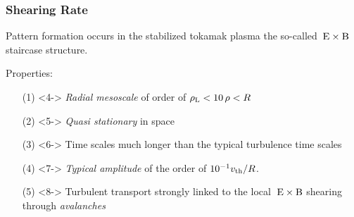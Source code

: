 \documentclass[compress,aspectratio=1610,noflama]{beamer}
\newcommand{\vect}[1]{\boldsymbol{\mathbf{#1}}}
\begin{document}
	\begin{frame}
		\frametitle{Shearing Rate}

		 Pattern formation occurs in the stabilized tokamak plasma the so-called $\mathrm{\:E}\times\mathrm{B}$ staircase structure. \\\bigskip
		
		 Properties:
		\begin{enumerate}
			\item[(1)] <4-> \textit{Radial mesoscale} of order of $\rho_\mathrm{L} < 10\,\rho < R$
			\item[(2)] <5-> \textit{Quasi stationary} in space 
			\item[(3)] <6-> Time scales much longer than the typical turbulence time scales
			\item[(4)] <7-> \textit{Typical amplitude} of the order of $10^{-1} v_{\mathrm{th}}/R$.
			\item[(5)] <8-> Turbulent transport strongly linked to the local $\mathrm{\:E}\times\mathrm{B}$ shearing through \textit{avalanches}
		\end{enumerate}
	\end{frame}

\end{document}
